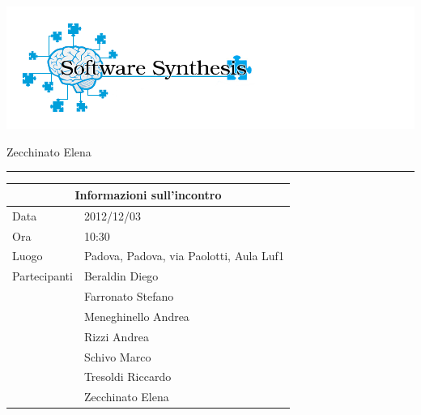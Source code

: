 \documentclass[a4paper,10pt,openright]{article}
\begin{document}
\includegraphics[width=1.5\textwidth]{logo}

\begin{center}

\begin{Large}
\hspace{1.2cm}{Verbale d'incontro 2012/12/03}
\newline
\end{Large}

\begin{small}
	Zecchinato Elena
\end{small}

\noindent\rule{\textwidth}{0.4pt}
\newline

\begin{tabular}{ll}
\toprule
\multicolumn{2}{c}{\sffamily Informazioni sull'incontro}\\
\midrule
Data & 2012/12/03 \\
Ora & 10:30 \\
Luogo & Padova, Padova, via Paolotti, Aula Luf1 \\
Partecipanti & Beraldin Diego \\ & Farronato Stefano \\ & Meneghinello Andrea \\ & Rizzi Andrea \\ & Schivo Marco \\ & Tresoldi Riccardo \\ & Zecchinato Elena\\
\bottomrule
\end{tabular}

\end{center}
\end{document}
